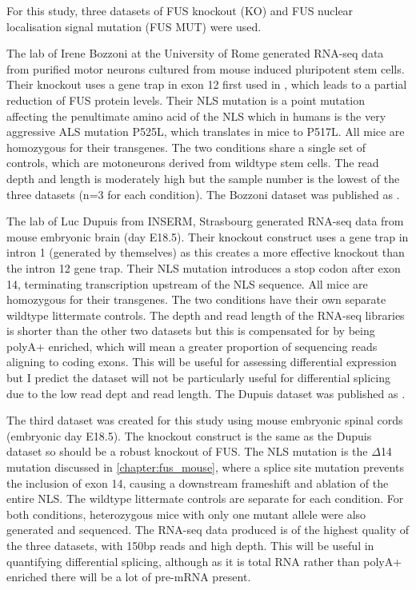 For this study, three datasets of FUS knockout (KO) and FUS nuclear localisation signal mutation (FUS MUT) were used.

The lab of Irene Bozzoni at the University of Rome generated RNA-seq data from purified motor neurons cultured from mouse induced pluripotent stem cells. 
Their knockout uses a gene trap in exon 12 first used in \citep{Hicks2000}, which leads to a partial reduction of FUS protein levels.
Their NLS mutation is a point mutation affecting the penultimate amino acid of the NLS which in humans is the very aggressive ALS mutation P525L, which translates in mice to P517L.  
All mice are homozygous for their transgenes. 
The two conditions share a single set of controls, which are motoneurons derived from wildtype stem cells.
The read depth and length is moderately high but the sample number is the lowest of the three datasets  (n=3 for each condition).
The Bozzoni dataset was published as \citep{Capauto2018}.

The lab of Luc Dupuis from INSERM, Strasbourg generated RNA-seq data from mouse embryonic brain (day E18.5). 
Their knockout construct uses a gene trap in intron 1 (generated by themselves) as this creates a more effective knockout than the intron 12 gene trap.  
Their NLS mutation introduces a stop codon after exon 14, terminating transcription upstream of the NLS sequence. 
All mice are homozygous for their transgenes. 
The two conditions have their own separate wildtype littermate controls. 
The depth and read length of the RNA-seq libraries is shorter than the other two datasets but this is compensated for by being polyA+ enriched, which will mean a greater proportion of sequencing reads aligning to coding exons.  
This will be useful for assessing differential expression but I predict the dataset will not be particularly useful for differential splicing due to the low read dept and read length.
The Dupuis dataset was published as \citep{Scekic-zahirovic2016}.

The third dataset was created for this study using mouse embryonic spinal cords (embryonic day E18.5). The knockout construct is the same as the Dupuis dataset so should be a robust knockout of FUS. 
The NLS mutation is the $\Delta$14 mutation discussed in \autoref{chapter:fus_mouse}, where a splice site mutation prevents the inclusion of exon 14, causing a downstream frameshift and ablation of the entire NLS. 
The wildtype littermate controls are separate for each condition. 
For both conditions, heterozygous mice with only one mutant allele were also generated and sequenced.
The RNA-seq data produced is of the highest quality of the three datasets, with 150bp reads and high depth. 
This will be useful in quantifying differential splicing, although as it is total RNA rather than polyA+ enriched there will be a lot of pre-mRNA present.


